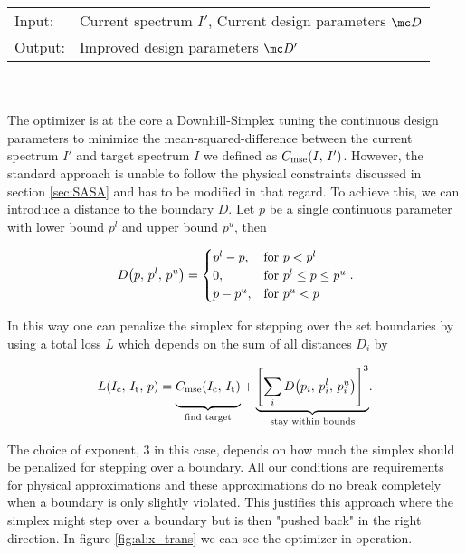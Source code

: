 \begin{tabular}{ll}
    \toprule
    Input: &
    Current spectrum $I'$, 
    Current design parameters $\mc D$\\
    Output: & 
    Improved design parameters $\mc D'$\\
    \bottomrule
\end{tabular}
\\
\\
The optimizer is at the core a Downhill-Simplex \cite{Nelder1965} tuning the continuous design parameters to minimize the mean-squared-difference between the current spectrum $I'$ and target spectrum $I$ we defined as 
$C_{\mathrm{mse}}\qty(I, \, I')$.
However, the standard approach is unable to follow the physical constraints discussed in section \ref{sec:SASA} and has to be modified in that regard. To achieve this, we can introduce a distance to the boundary $D$. Let $p$ be a single continuous parameter with lower bound $p^l$ and upper bound $p^u$, then

\begin{equation}
    D\qty(p, \, p^l, \, p^u) =
    \begin{cases}
        p^l - p, & \text{for } p < p^l\\
        0, & \text{for } p^l \leq p \leq p^u\\
        p - p^u, & \text{for } p^u < p
    \end{cases}.
\end{equation}

\noindent
In this way one can penalize the simplex for stepping over the set boundaries by using a total loss $L$ which depends on the sum of all distances $D_i$ by

\begin{equation}\label{eq:al:simlex_loss}
    L(I_\s{c}, \,I_\s{t}, \,p) =
    {\underbrace{%
    \vphantom{ \left(\frac{a^{0.3}}{b}\right) }
    C_\s{mse}(I_\s{c}, \, I_\s{t})}_{\text{find target}}}
    +
    {\underbrace{%
    \qty[\sum_i D\qty(p_i, \, p_i^l, \, p_i^u)]^3
    }_{\text{stay within bounds}}}.
\end{equation}

The choice of exponent, 3 in this case, depends on how much the simplex should be penalized for stepping over a boundary.
All our conditions are requirements for physical approximations and these approximations do no break completely when a boundary is only slightly violated. This justifies this approach where the simplex might step over a boundary but is then "pushed back" in the right direction. In figure \ref{fig:al:x_trans} we can see the optimizer in operation.
\\

